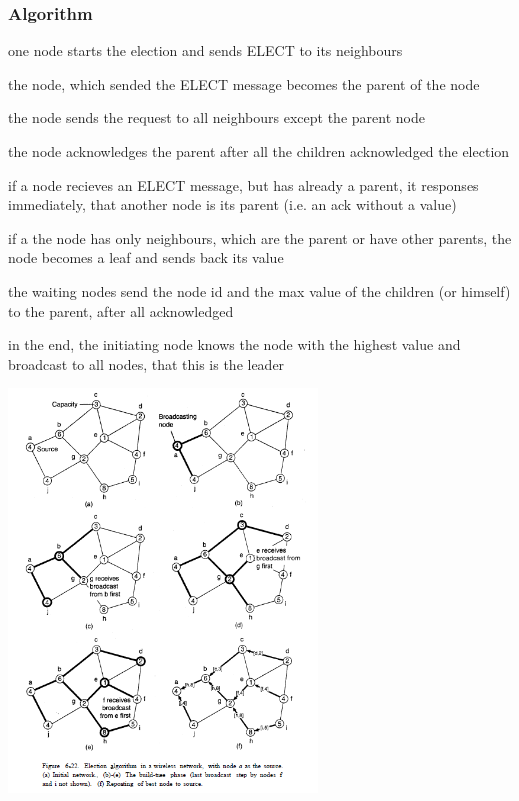\subsubsection*{Algorithm}
\begin{compactenum}
\item one node starts the election and sends ELECT to its neighbours
\item the node, which sended the ELECT message becomes the parent of the node
\item the node sends the request to all neighbours except the parent node
\item the node acknowledges the parent after all the children acknowledged the election
\item if a node recieves an ELECT message, but has already a parent, it responses immediately, that another node is its parent (i.e. an ack without a value)
\item if a the node has only neighbours, which are the parent or have other parents, the node becomes a leaf and sends back its value
\item the waiting nodes send the node id and the max value of the children (or himself) to the parent, after all acknowledged
\item in the end, the initiating node knows the node with the highest value and broadcast to all nodes, that this is the leader
\end{compactenum}

\begin{minipage}{\linewidth}
	\centering\includegraphics[width=310px]{gfx/Leader_adhoc.png}
	\label{img:Leader_adhoc}
\end{minipage}

